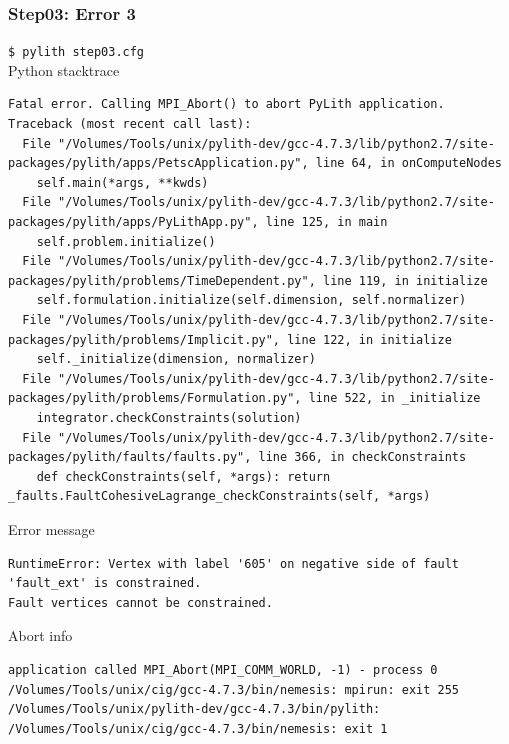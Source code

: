 \documentclass{beamer}
\newcommand{\cmd}[1]{{\tiny\tt \color{ltred}#1}}
\newcommand{\errlabel}[1]{{\small \color{blue}#1}}
\begin{document}
\begin{frame}[fragile]
  \frametitle{Step03: Error 3}

\cmd{\$ pylith step03.cfg}\\
\errlabel{Python stacktrace}
\begin{lstlisting}
Fatal error. Calling MPI_Abort() to abort PyLith application.
Traceback (most recent call last):
  File "/Volumes/Tools/unix/pylith-dev/gcc-4.7.3/lib/python2.7/site-packages/pylith/apps/PetscApplication.py", line 64, in onComputeNodes
    self.main(*args, **kwds)
  File "/Volumes/Tools/unix/pylith-dev/gcc-4.7.3/lib/python2.7/site-packages/pylith/apps/PyLithApp.py", line 125, in main
    self.problem.initialize()
  File "/Volumes/Tools/unix/pylith-dev/gcc-4.7.3/lib/python2.7/site-packages/pylith/problems/TimeDependent.py", line 119, in initialize
    self.formulation.initialize(self.dimension, self.normalizer)
  File "/Volumes/Tools/unix/pylith-dev/gcc-4.7.3/lib/python2.7/site-packages/pylith/problems/Implicit.py", line 122, in initialize
    self._initialize(dimension, normalizer)
  File "/Volumes/Tools/unix/pylith-dev/gcc-4.7.3/lib/python2.7/site-packages/pylith/problems/Formulation.py", line 522, in _initialize
    integrator.checkConstraints(solution)
  File "/Volumes/Tools/unix/pylith-dev/gcc-4.7.3/lib/python2.7/site-packages/pylith/faults/faults.py", line 366, in checkConstraints
    def checkConstraints(self, *args): return _faults.FaultCohesiveLagrange_checkConstraints(self, *args)
\end{lstlisting}
\errlabel{Error message}
\begin{lstlisting}
RuntimeError: Vertex with label '605' on negative side of fault 'fault_ext' is constrained.
Fault vertices cannot be constrained.
\end{lstlisting}
\errlabel{Abort info}
\begin{lstlisting}
application called MPI_Abort(MPI_COMM_WORLD, -1) - process 0
/Volumes/Tools/unix/cig/gcc-4.7.3/bin/nemesis: mpirun: exit 255
/Volumes/Tools/unix/pylith-dev/gcc-4.7.3/bin/pylith:
/Volumes/Tools/unix/cig/gcc-4.7.3/bin/nemesis: exit 1
\end{lstlisting}

\end{frame}
\end{document}
